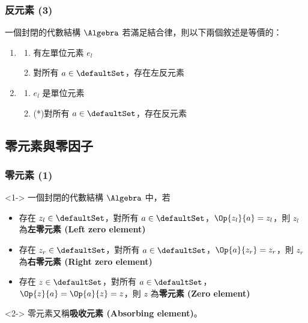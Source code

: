 \documentclass[utf8]{beamer}
\begin{document}
\begin{CJK}{UTF8}{bkai}
\begin{frame}
  \frametitle{反元素 (3)}
  \begin{mythm}
  \label{thm:algebra:left_identity_inverse}
  一個封閉的代數結構 $\Algebra$ 若滿足結合律，則以下兩個敘述是等價的：
  \begin{enumerate}
  \item<2-> \label{thm:algebra:left_id_inv_first}
      \begin{enumerate}
      \item 有左單位元素 $e_l$
      \item 對所有 $a\in{\defaultSet}$，存在左反元素
      \end{enumerate}
  \item<3-> \label{thm:algebra:left_id_inv_second}
      \begin{enumerate}
      \item $e_l$ 是單位元素
      \item (*)\label{exe:algebra:left_identity_inverse}對所有 $a\in{\defaultSet}$，存在反元素
      \end{enumerate}
  \end{enumerate}
  \end{mythm}
\end{frame}

\subsection{零元素與零因子}

\begin{frame}
  \frametitle{零元素 (1)}
  \begin{mydef}[零元素]<1->
  \label{def:algebra:zero_element}
  一個封閉的代數結構 $\Algebra$ 中，若
  \begin{itemize}
  \item 存在 $z_l\in{\defaultSet}$，對所有 $a\in{\defaultSet}$，$\Op{z_l}{a}=z_l$，則 $z_l$ 為\textbf{左零元素 (Left zero element)}
  \item 存在 $z_r\in{\defaultSet}$，對所有 $a\in{\defaultSet}$，$\Op{a}{z_r}=z_r$，則 $z_r$ 為\textbf{右零元素 (Right zero element)}
  \item 存在 $z\in{\defaultSet}$，對所有 $a\in{\defaultSet}$，$\Op{z}{a}=\Op{a}{z}=z$，則 $z$ 為\textbf{零元素 (Zero element)}
  \end{itemize}
  \end{mydef}
  \begin{mynote*}<2->
  零元素又稱\textbf{吸收元素 (Absorbing element)}。
  \end{mynote*}
\end{frame}


\end{CJK}
\end{document}
